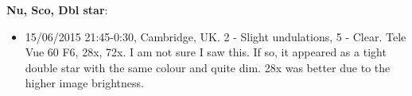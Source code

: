 {\bf Nu, Sco, Dbl star}:
\begin{itemize}
\item 15/06/2015 21:45-0:30, Cambridge, UK. 2 - Slight undulations, 5 - Clear. Tele Vue 60 F6, 28x, 72x. I am not sure I saw this. If so, it appeared as a tight double star with the same colour and quite dim. 28x was better due to the higher image brightness.
\end{itemize}

